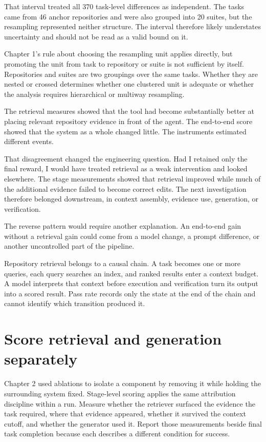That interval treated all 370 task-level differences as independent. The tasks came from 46 anchor repositories and were also grouped into 20 suites, but the resampling represented neither structure. The interval therefore likely understates uncertainty and should not be read as a valid bound on it.

Chapter 1's rule about choosing the resampling unit applies directly, but promoting the unit from task to repository or suite is not sufficient by itself. Repositories and suites are two groupings over the same tasks. Whether they are nested or crossed determines whether one clustered unit is adequate or whether the analysis requires hierarchical or multiway resampling.

The retrieval measures showed that the tool had become substantially better at placing relevant repository evidence in front of the agent. The end-to-end score showed that the system as a whole changed little. The instruments estimated different events.

That disagreement changed the engineering question. Had I retained only the final reward, I would have treated retrieval as a weak intervention and looked elsewhere. The stage measurements showed that retrieval improved while much of the additional evidence failed to become correct edits. The next investigation therefore belonged downstream, in context assembly, evidence use, generation, or verification.

The reverse pattern would require another explanation. An end-to-end gain without a retrieval gain could come from a model change, a prompt difference, or another uncontrolled part of the pipeline.

Repository retrieval belongs to a causal chain. A task becomes one or more queries, each query searches an index, and ranked results enter a context budget. A model interprets that context before execution and verification turn its output into a scored result. Pass rate records only the state at the end of the chain and cannot identify which transition produced it.

\hypertarget{score-retrieval-and-generation-separately}{%
\section{Score retrieval and generation separately}\label{score-retrieval-and-generation-separately}}

Chapter 2 used ablations to isolate a component by removing it while holding the surrounding system fixed. Stage-level scoring applies the same attribution discipline within a run. Measure whether the retriever surfaced the evidence the task required, where that evidence appeared, whether it survived the context cutoff, and whether the generator used it. Report those measurements beside final task completion because each describes a different condition for success.

